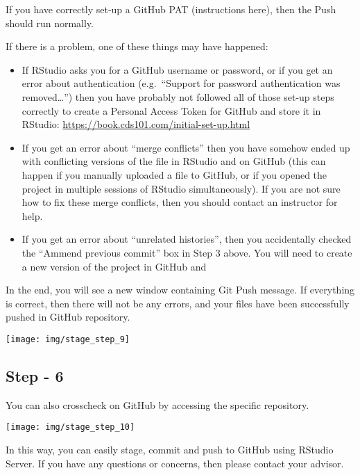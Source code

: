 \documentclass[
]{book}
\begin{document}
If you have correctly set-up a GitHub PAT (instructions here), then the Push should run normally.

If there is a problem, one of these things may have happened:

\begin{itemize}
\item
  If RStudio asks you for a GitHub username or password, or if you get an error about authentication (e.g.~``Support for password authentication was removed\ldots{}'') then you have probably not followed all of those set-up steps correctly to create a Personal Access Token for GitHub and store it in RStudio: \url{https://book.cds101.com/initial-set-up.html}
\item
  If you get an error about ``merge conflicts'' then you have somehow ended up with conflicting versions of the file in RStudio and on GitHub (this can happen if you manually uploaded a file to GitHub, or if you opened the project in multiple sessions of RStudio simultaneously). If you are not sure how to fix these merge conflicts, then you should contact an instructor for help.
\item
  If you get an error about ``unrelated histories'', then you accidentally checked the ``Ammend previous commit'' box in Step 3 above. You will need to create a new version of the project in GitHub and
\end{itemize}

In the end, you will see a new window containing Git Push message. If everything is correct, then there will not be any errors, and your files have been successfully pushed in GitHub repository.

\begin{center}\texttt{[image: img/stage\_step\_9]} \end{center}

\hypertarget{step---6-1}{%
\subsection{Step - 6}\label{step---6-1}}

You can also crosscheck on GitHub by accessing the specific repository.

\begin{center}\texttt{[image: img/stage\_step\_10]} \end{center}

In this way, you can easily stage, commit and push to GitHub using RStudio Server. If you have any questions or concerns, then please contact your advisor.
\end{document}
